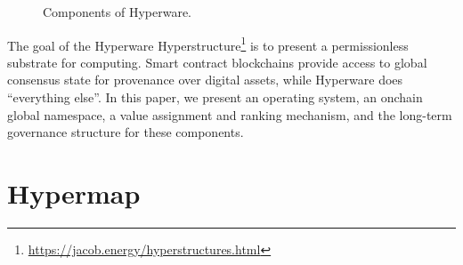 \documentclass[runningheads]{llncs}
\begin{document}
\begin{figure}[H]
    \centering
    \caption{Components of Hyperware.}
    \label{fig:triangle}
\end{figure}

The goal of the Hyperware Hyperstructure\footnote{\url{https://jacob.energy/hyperstructures.html}}
is to present a permissionless substrate for computing.
Smart contract blockchains provide access to global consensus state for provenance over digital assets, while Hyperware does ``everything else''.
In this paper, we present an operating system, an onchain global namespace, a value assignment and ranking mechanism, and the long-term governance structure for these components.

\section{Hypermap}
\label{sec:hypermap}
\end{document}
